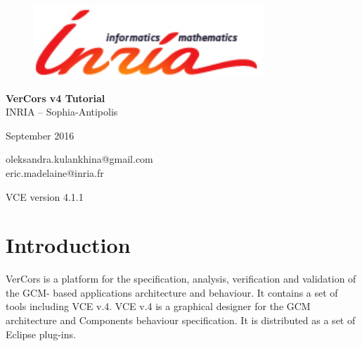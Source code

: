 \documentclass[12pt]{article}
\begin{document}
\begin{titlepage}

\begin{figure}[t]
    \centering
    \includegraphics[scale=0.4]{./draws/inria-logo.png}
\end{figure}

\vspace*{2cm}
\begin{center}
	{\huge \textbf{VerCors v4 Tutorial}} \vspace*{1cm}
\\
    {\large INRIA – Sophia-Antipolis } \medskip \\
\end{center}

%
\vfill
\begin{center}
\begin{minipage}[b]{0.5\textwidth}
    \vspace*{1.3cm}
    \begin{center}
        {\large September 2016}
    \end{center}
        \begin{center}
        {\large oleksandra.kulankhina@gmail.com \\
        \large eric.madelaine@inria.fr}
    \end{center}
     \vspace*{1cm}
        \begin{center}
        {\large VCE version 4.1.1}
    \end{center}
\end{minipage}%
\end{center}

\thispagestyle{empty}

\end{titlepage}

\tableofcontents
\newpage

\section{Introduction}\label{sec:intro}
VerCors is a platform for the specification, analysis, verification and validation of the GCM-
based applications architecture and behaviour. It contains a set of tools including VCE v.4. VCE v.4 is a graphical designer for the GCM architecture and Components behaviour specification. It is distributed as a set of Eclipse plug-ins.
\end{document}
